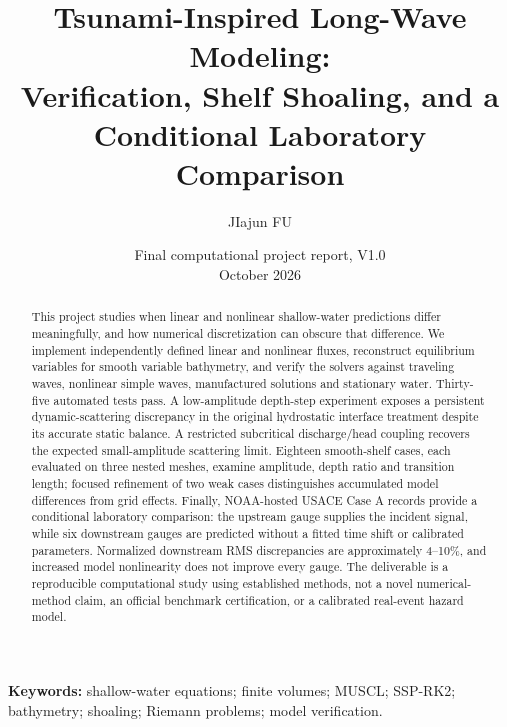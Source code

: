 \documentclass[11pt]{article}
\title{Tsunami-Inspired Long-Wave Modeling:\\Verification, Shelf Shoaling, and a\\Conditional Laboratory Comparison}
\author{JIajun FU}
\date{Final computational project report, V1.0\\October 2026}
\begin{document}
\maketitle
\begin{abstract}
This project studies when linear and nonlinear shallow-water predictions differ
meaningfully, and how numerical discretization can obscure that difference.
We implement independently defined linear and nonlinear fluxes, reconstruct
equilibrium variables for smooth variable bathymetry, and verify the solvers
against traveling waves, nonlinear simple waves, manufactured solutions and
stationary water. Thirty-five automated tests pass. A low-amplitude depth-step
experiment exposes a persistent dynamic-scattering discrepancy in the original
hydrostatic interface treatment despite its accurate static balance. A restricted
subcritical discharge/head coupling recovers the expected small-amplitude
scattering limit. Eighteen smooth-shelf cases, each evaluated on three nested
meshes, examine amplitude, depth ratio and transition length; focused refinement
of two weak cases distinguishes accumulated model differences from grid effects.
Finally, NOAA-hosted USACE Case A records provide a conditional laboratory
comparison: the upstream gauge supplies the incident signal, while six downstream
gauges are predicted without a fitted time shift or calibrated parameters.
Normalized downstream RMS discrepancies are approximately 4--10\%, and increased
model nonlinearity does not improve every gauge. The deliverable is a reproducible
computational study using established methods, not a novel numerical-method claim,
an official benchmark certification, or a calibrated real-event hazard model.
\end{abstract}
\textbf{Keywords:} shallow-water equations; finite volumes; MUSCL; SSP-RK2;\\
bathymetry; shoaling; Riemann problems; model verification.
\tableofcontents
\newpage
\end{document}
